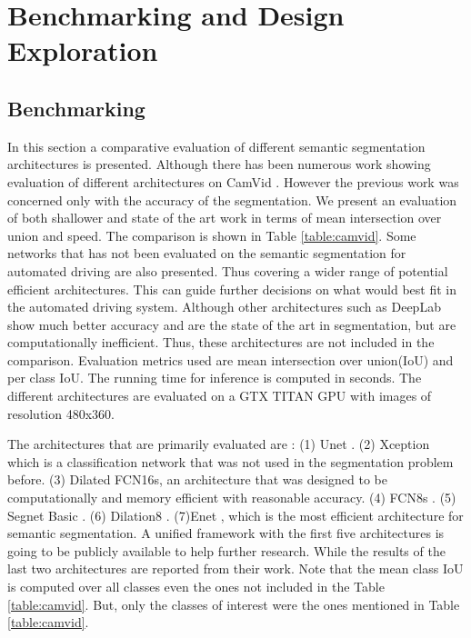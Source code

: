 \documentclass[conference]{IEEEtran}
\begin{document}
\section{Benchmarking and Design Exploration}\label{sec:results}
\subsection{Benchmarking}
In this section a comparative evaluation of different semantic segmentation architectures is presented. Although there has been numerous work showing evaluation of different architectures on CamVid \cite{brostow2008segmentation}. However the previous work was concerned only with the accuracy of the segmentation. We present an evaluation of both shallower and state of the art work in terms of mean intersection over union and speed. The comparison is shown in Table \ref{table:camvid}. Some networks that has not been evaluated on the semantic segmentation for automated driving are also presented. Thus covering a wider range of potential efficient architectures. This can guide further decisions on what would best fit in the automated driving system. Although other architectures such as DeepLab\cite{chen2016deeplab} show much better accuracy and are the state of the art in segmentation, but are computationally inefficient. Thus, these architectures are not included in the comparison. Evaluation metrics used are mean intersection over union(IoU) and per class IoU. The running time for inference is computed in seconds. The different architectures are evaluated on a GTX TITAN GPU with images of resolution 480x360. 

The architectures that are primarily evaluated are : (1) Unet \cite{ronneberger2015u}. (2) Xception \cite{chollet2016xception} which is a classification network that was not used in the segmentation problem before. (3) Dilated FCN16s, an architecture that was designed to be computationally and memory efficient with reasonable accuracy. (4) FCN8s \cite{long2015fully}. (5) Segnet Basic \cite{badrinarayanan2015segnet}. (6) Dilation8 \cite{yu2015multi}. (7)Enet \cite{paszke2016enet}, which is the most efficient architecture for semantic segmentation. A unified framework with the first five architectures is going to be publicly available to help further research. While the results of the last two architectures are reported from their work. Note that the mean class IoU is computed over all classes even the ones not included in the Table \ref{table:camvid}. But, only the classes of interest were the ones mentioned in Table \ref{table:camvid}.
\end{document}
